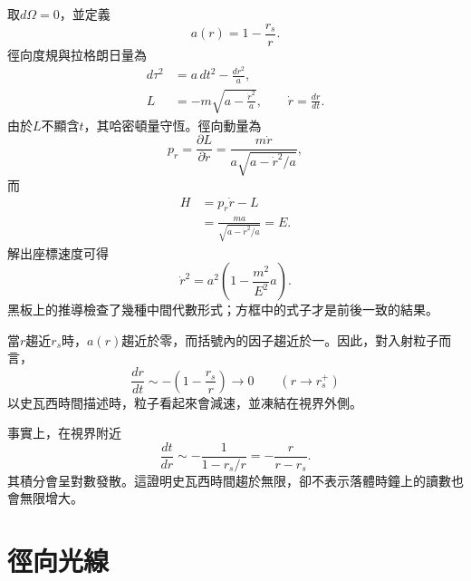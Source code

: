 取\(d\Omega=0\)，並定義
\begin{equation}
a(r)=1-\frac{r_s}{r}.
\label{eq:l5-a-def}
\end{equation}
徑向度規與拉格朗日量為
\begin{align}
d\tau^2&=a\,dt^2-\frac{dr^2}{a},\\
L&=-m\sqrt{a-\frac{\dot r^2}{a}},
\qquad
\dot r=\frac{dr}{dt}.
\label{eq:l5-radial-lagrangian}
\end{align}
由於\(L\)不顯含\(t\)，其哈密頓量守恆。徑向動量為
\begin{equation}
p_r=\frac{\partial L}{\partial\dot r}
=\frac{m\dot r}{a\sqrt{a-\dot r^2/a}},
\label{eq:l5-radial-momentum}
\end{equation}
而
\begin{align}
H
&=p_r\dot r-L\\
&=\frac{ma}{\sqrt{a-\dot r^2/a}}
=E.
\label{eq:l5-radial-energy}
\end{align}
解出座標速度可得
\begin{equation}
\boxed{
\dot r^2
=a^2\left(1-\frac{m^2}{E^2}a\right).
}
\label{eq:l5-radial-velocity}
\end{equation}
黑板上的推導檢查了幾種中間代數形式；方框中的式子才是前後一致的結果。

當\(r\)趨近\(r_s\)時，\(a(r)\)趨近於零，而括號內的因子趨近於一。因此，對入射粒子而言，
\begin{equation}
\frac{dr}{dt}
\sim -\left(1-\frac{r_s}{r}\right)
\longrightarrow 0
\qquad(r\longrightarrow r_s^+)
\label{eq:l5-infall-freeze}
\end{equation}
以史瓦西時間描述時，粒子看起來會減速，並凍結在視界外側。

\begin{classroomqa}
\end{classroomqa}

事實上，在視界附近
\begin{equation}
\frac{dt}{dr}
\sim-\frac{1}{1-r_s/r}
=-\frac{r}{r-r_s}.
\end{equation}
其積分會呈對數發散。這證明史瓦西時間趨於無限，卻不表示落體時鐘上的讀數也會無限增大。

\section{徑向光線}

